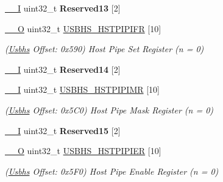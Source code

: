 \begin{DoxyCompactItemize}
\mbox{\label{structUsbhs_a627eb49c7faf50c75e49c22e17aa32ae}} 
\mbox{\hyperlink{core__cm7_8h_af63697ed9952cc71e1225efe205f6cd3}{\+\_\+\+\_\+I}} uint32\+\_\+t {\bfseries Reserved13} \mbox{[}2\mbox{]}
\item 
\mbox{\label{structUsbhs_aa7fb2e6238130257cba6bbb500dafc77}} 
\mbox{\hyperlink{core__cm7_8h_a7e25d9380f9ef903923964322e71f2f6}{\+\_\+\+\_\+O}} uint32\+\_\+t \mbox{\hyperlink{structUsbhs_aa7fb2e6238130257cba6bbb500dafc77}{U\+S\+B\+H\+S\+\_\+\+H\+S\+T\+P\+I\+P\+I\+FR}} \mbox{[}10\mbox{]}
\begin{DoxyCompactList}\small\item\em (\mbox{\hyperlink{structUsbhs}{Usbhs}} Offset\+: 0x590) Host Pipe Set Register (n = 0) \end{DoxyCompactList}\item 
\mbox{\label{structUsbhs_a93f5fb7068697c72706c187e2d5af871}} 
\mbox{\hyperlink{core__cm7_8h_af63697ed9952cc71e1225efe205f6cd3}{\+\_\+\+\_\+I}} uint32\+\_\+t {\bfseries Reserved14} \mbox{[}2\mbox{]}
\item 
\mbox{\label{structUsbhs_a710b26994ced1aecf8fd6ed7d5b64841}} 
\mbox{\hyperlink{core__cm7_8h_af63697ed9952cc71e1225efe205f6cd3}{\+\_\+\+\_\+I}} uint32\+\_\+t \mbox{\hyperlink{structUsbhs_a710b26994ced1aecf8fd6ed7d5b64841}{U\+S\+B\+H\+S\+\_\+\+H\+S\+T\+P\+I\+P\+I\+MR}} \mbox{[}10\mbox{]}
\begin{DoxyCompactList}\small\item\em (\mbox{\hyperlink{structUsbhs}{Usbhs}} Offset\+: 0x5\+C0) Host Pipe Mask Register (n = 0) \end{DoxyCompactList}\item 
\mbox{\label{structUsbhs_a132967667ef2223e0993da94cedffb45}} 
\mbox{\hyperlink{core__cm7_8h_af63697ed9952cc71e1225efe205f6cd3}{\+\_\+\+\_\+I}} uint32\+\_\+t {\bfseries Reserved15} \mbox{[}2\mbox{]}
\item 
\mbox{\label{structUsbhs_a904de96b699f8cf3b044dcd07bb15efc}} 
\mbox{\hyperlink{core__cm7_8h_a7e25d9380f9ef903923964322e71f2f6}{\+\_\+\+\_\+O}} uint32\+\_\+t \mbox{\hyperlink{structUsbhs_a904de96b699f8cf3b044dcd07bb15efc}{U\+S\+B\+H\+S\+\_\+\+H\+S\+T\+P\+I\+P\+I\+ER}} \mbox{[}10\mbox{]}
\begin{DoxyCompactList}\small\item\em (\mbox{\hyperlink{structUsbhs}{Usbhs}} Offset\+: 0x5\+F0) Host Pipe Enable Register (n = 0) \end{DoxyCompactList}\item 

\end{DoxyCompactItemize}
